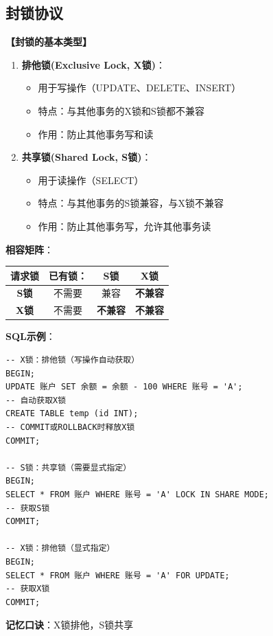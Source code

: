 \documentclass[12pt, a4paper]{article}
\newenvironment{bluebox}[1]{%
  \begin{trivlist}
  \item[\hskip\labelsep \textbf{#1}]
  \setlength{\parskip}{0.5ex}
  \setlength{\itemsep}{0.5ex}
}{%
  \end{trivlist}
  }
\begin{document}
\subsection{封锁协议}

\begin{bluebox}{封锁类型}
	\textbf{【封锁的基本类型】}

	\begin{enumerate}[leftmargin=*, label=\textbf{\arabic*.}]
		\item \textbf{排他锁(Exclusive Lock, X锁)}：
		      \begin{itemize}[nosep]
			      \item 用于写操作（UPDATE、DELETE、INSERT）
			      \item 特点：与其他事务的X锁和S锁都不兼容
			      \item 作用：防止其他事务写和读
		      \end{itemize}

		\item \textbf{共享锁(Shared Lock, S锁)}：
		      \begin{itemize}[nosep]
			      \item 用于读操作（SELECT）
			      \item 特点：与其他事务的S锁兼容，与X锁不兼容
			      \item 作用：防止其他事务写，允许其他事务读
		      \end{itemize}
	\end{enumerate}

	\textbf{相容矩阵}：

	\begin{tabular}{|c|c|c|c|}
		\hline
		\textbf{请求锁} & \textbf{已有锁：} & \textbf{S锁}  & \textbf{X锁}  \\
		\hline
		\textbf{S锁}  & 不需要           & 兼容           & \textbf{不兼容} \\
		\hline
		\textbf{X锁}  & 不需要           & \textbf{不兼容} & \textbf{不兼容} \\
		\hline
	\end{tabular}

	\textbf{SQL示例}：
	\begin{verbatim}
-- X锁：排他锁（写操作自动获取）
BEGIN;
UPDATE 账户 SET 余额 = 余额 - 100 WHERE 账号 = 'A';
-- 自动获取X锁
CREATE TABLE temp (id INT);
-- COMMIT或ROLLBACK时释放X锁
COMMIT;

-- S锁：共享锁（需要显式指定）
BEGIN;
SELECT * FROM 账户 WHERE 账号 = 'A' LOCK IN SHARE MODE;
-- 获取S锁
COMMIT;

-- X锁：排他锁（显式指定）
BEGIN;
SELECT * FROM 账户 WHERE 账号 = 'A' FOR UPDATE;
-- 获取X锁
COMMIT;
	\end{verbatim}

	\textbf{记忆口诀}：X锁排他，S锁共享
\end{bluebox}
\end{document}
